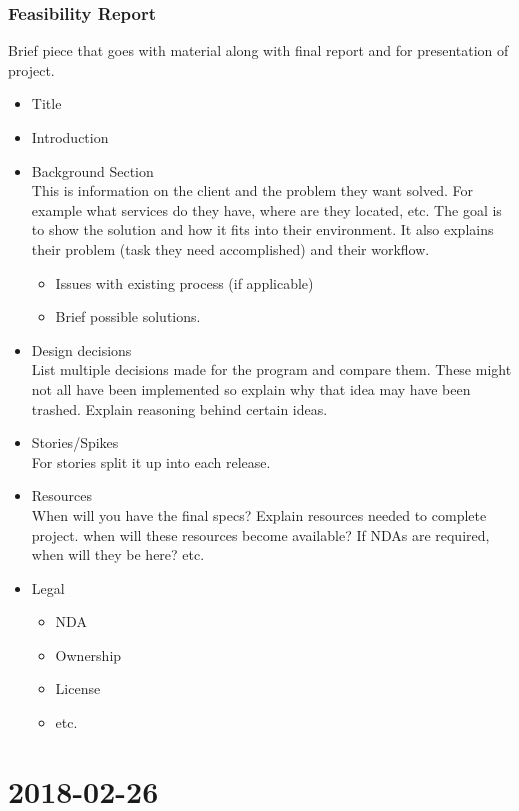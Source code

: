 \documentclass{report}
\newcommand{\mychapter}[2]{
	\setcounter{chapter}{#1}
	\setcounter{section}{0}
	\chapter*{#2}
	\addcontentsline{toc}{chapter}{#2}
}
\begin{document}
\subsection{Feasibility Report}
	Brief piece that goes with material along with final report and for presentation of project.
\begin{itemize}
\item Title
\item Introduction
\item Background Section\\
	This is information on the client and the problem they want solved. For example what services do they have, where are they located, etc. The goal is to show the solution and how it fits into their environment. It also explains their problem (task they need accomplished) and their workflow.
	\begin{itemize}
	\item Issues with existing process (if applicable)
	\item Brief possible solutions.
	\end{itemize}
\item Design decisions\\
	List multiple decisions made for the program and compare them. These might not all have been implemented so explain why that idea may have been trashed. Explain reasoning behind certain ideas.
\item Stories/Spikes\\
	For stories split it up into each release.
\item Resources\\
	When will you have the final specs? Explain resources needed to complete project. when will these resources become available? If NDAs are required, when will they be here? etc.
\item Legal
	\begin{itemize}
	\item NDA
	\item Ownership
	\item License
	\item etc.
	\end{itemize}
\end{itemize}
	
	
	
	
\mychapter{3}{2018-02-26}
\end{document}
